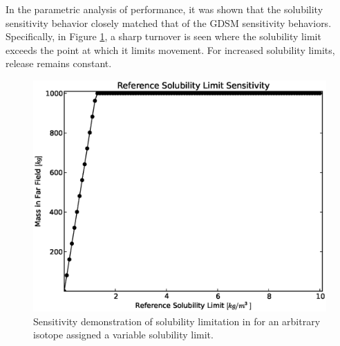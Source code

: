 In the parametric analysis of \Cyder performance, it was shown that the 
solubility sensitivity behavior closely matched that of the \gls{GDSM} 
sensitivity behaviors. Specifically, in Figure \ref{fig:sol_result}, a sharp turnover 
is seen where the solubility limit exceeds the point at which it limits 
movement. For increased solubility limits, release remains constant.

\begin{figure}[htbp!]
\begin{center}
\includegraphics[width=0.7\linewidth]{./chapters/demonstration/bench/sol.eps}
\end{center}
\caption[Solubility Sensitivity in the Mixed Cell Model]{Sensitivity demonstration of solubility limitation in \Cyder for an 
arbitrary isotope assigned a variable solubility limit. }
\label{fig:sol_result}
\end{figure}

